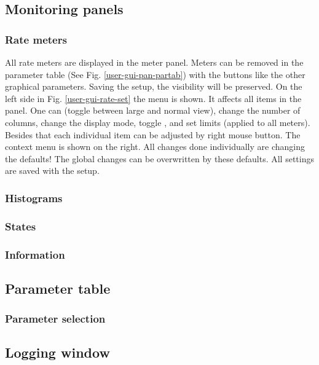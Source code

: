 {{\subsection{Monitoring panels}
\subsubsection{Rate meters}
All rate meters are displayed in the meter panel. Meters can be removed
in the parameter table (See Fig. \ref{user-gui-pan-partab}) 
with the  buttons like the other graphical parameters.
Saving the setup, the visibility will be preserved.
On the left side in Fig. \ref{user-gui-rate-set} the 
menu is shown. It affects all items in the panel. One can 
(toggle between large and normal view), change the number of
columns, change the display mode, toggle , and set limits
(applied to all meters). Besides that each individual item can be
adjusted by right mouse button. The context menu is shown on the right.
All changes done individually are changing the defaults!
The global changes can be overwritten by these defaults.
All settings are saved with the setup.
\subsubsection{Histograms}
\subsubsection{States}
\subsubsection{Information}
\subsection{Parameter table}
\subsubsection{Parameter selection}
\subsection{Logging window}
}}
